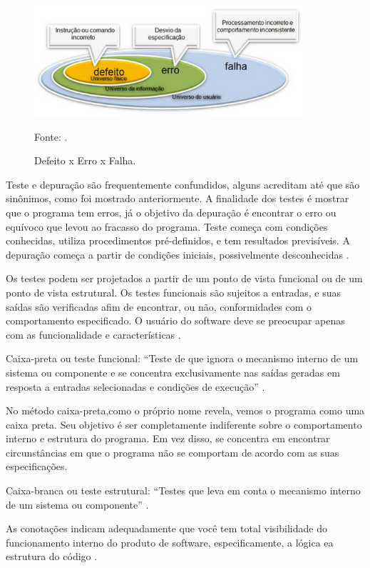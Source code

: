 \begin{figure}[htp]
\centering
\includegraphics[width=0.9\textwidth]{figuras/defeitoErroFalha}
\caption{Defeito x Erro x Falha.}{Fonte:  .}
\label{defeitoErroFalha}
\end{figure}

Teste e depuração são frequentemente confundidos, alguns acreditam até que são sinônimos, como foi mostrado anteriormente. A finalidade dos testes é mostrar que o programa tem erros, já o objetivo da depuração é encontrar o erro ou equívoco que levou ao fracasso do programa. Teste começa com condições conhecidas, utiliza procedimentos pré-definidos, e tem resultados previsíveis. A depuração começa a partir de condições iniciais, possivelmente desconhecidas \cite{beizer1990}.

Os testes podem ser projetados a partir de um ponto de vista funcional ou de um ponto de vista estrutural. Os testes funcionais são sujeitos a entradas, e suas saídas são verificadas afim de encontrar, ou não, conformidades com o comportamento especificado. O usuário do software deve se preocupar apenas com as funcionalidade e características \cite{beizer1990}.

Caixa-preta ou teste funcional:  “Teste de que ignora o mecanismo interno de um sistema ou componente e se concentra exclusivamente nas saídas geradas em resposta a entradas selecionadas e condições de execução” \cite{ieee}.

No método caixa-preta,como o próprio nome revela, vemos o programa como uma caixa preta. Seu objetivo é ser completamente indiferente sobre o comportamento interno e estrutura do programa. Em vez disso, se concentra em encontrar circunstâncias em que o programa não se comportam de acordo com as suas especificações\cite[pág.~13]{myers2004}.

Caixa-branca ou teste estrutural: “Testes que leva em conta o mecanismo interno de um sistema ou componente” \cite{ieee}.

 As conotações indicam adequadamente que você tem total visibilidade do funcionamento interno do produto de software, especificamente, a lógica ea estrutura do código \cite[pág.~1]{williams2006}.

